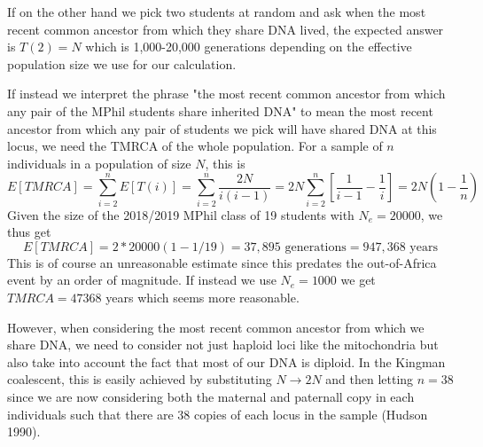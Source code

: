 \documentclass{article}
\begin{document}
If on the other hand we pick two students at random and ask when the most recent common ancestor from which they share DNA lived, the expected answer is $T(2) = N$ which is 1,000-20,000 generations depending on the effective population size we use for our calculation.

If instead we interpret the phrase "the most recent common ancestor from which any pair of the MPhil students share inherited DNA" to mean the most recent ancestor from which any pair of students we pick will have shared DNA at this locus, we need the TMRCA of the whole population. For a sample of $n$ individuals in a population of size $N$, this is
\begin{equation}
E[TMRCA] = \sum_{i=2}^n{E[T(i)]} = \sum_{i=2}^n{\dfrac{2N}{i(i-1)}} = 2N \sum_{i=2}^n{[\dfrac{1}{i-1}-\dfrac{1}{i}] = 2N(1-\dfrac{1}{n})}
\end{equation}
Given the size of the 2018/2019 MPhil class of 19 students with $N_e = 20000$, we thus get
\begin{equation}
E[TMRCA] = 2*20000(1 - 1/19) = 37,895 \text{ generations} = 947,368 \text{ years}
\end{equation}
This is of course an unreasonable estimate since this predates the out-of-Africa event by an order of magnitude. If instead we use $N_e = 1000$ we get $TMRCA = 47368$ years which seems more reasonable.


However, when considering the most recent common ancestor from which we share DNA, we need to consider not just haploid loci like the mitochondria but also take into account the fact that most of our DNA is diploid. In the Kingman coalescent, this is easily achieved by substituting $N \rightarrow 2N$ and then letting $n = 38$ since we are now considering both the maternal and paternall copy in each individuals such that there are 38 copies of each locus in the sample (Hudson 1990).
\end{document}
